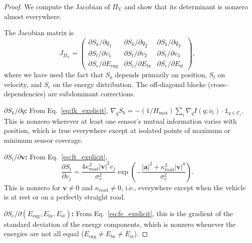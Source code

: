 \documentclass[twocolumn,10pt]{article}
\newcommand{\PiV}{\Pi_{\mathrm{V}}}
\newcommand{\Sk}{S_k}
\newcommand{\St}{S_t}
\newcommand{\Se}{S_e}
\newcommand{\Hmax}{H_{\mathrm{max}}}
\begin{document}
\begin{proof}
We compute the Jacobian of $\PiV$ and show that its determinant is nonzero almost everywhere.

The Jacobian matrix is
\begin{equation}
J_{\PiV} = \begin{pmatrix}
\partial \Sk / \partial q_1 & \partial \Sk / \partial q_2 & \partial \Sk / \partial q_3 \\
\partial \St / \partial v_1 & \partial \St / \partial v_2 & \partial \St / \partial v_3 \\
\partial \Se / \partial E_{\mathrm{eng}} & \partial \Se / \partial E_{\mathrm{br}} & \partial \Se / \partial E_{\mathrm{st}}
\end{pmatrix},
\end{equation}
where we have used the fact that $\Sk$ depends primarily on position, $\St$ on velocity, and $\Se$ on the energy distribution. The off-diagonal blocks (cross-dependencies) are subdominant corrections.

\textbf{$\partial \Sk / \partial q$:} From Eq.~\eqref{eq:fk_explicit}, $\nabla_q \Sk = -(1/\Hmax) \sum_i \nabla_q I(q; o_i) \cdot \mathbb{1}_{q \in \mathcal{C}_i}$. This is nonzero wherever at least one sensor's mutual information varies with position, which is true everywhere except at isolated points of maximum or minimum sensor coverage.

\textbf{$\partial \St / \partial \mathbf{v}$:} From Eq.~\eqref{eq:ft_explicit},
\begin{equation}
\frac{\partial \St}{\partial v_j} = \frac{4\kappa_{\mathrm{road}}^2 |\mathbf{v}|^2 v_j}{\sigma_v^2} \exp\left(-\frac{|\mathbf{a}|^2 + \kappa_{\mathrm{road}}^2 |\mathbf{v}|^4}{\sigma_v^2}\right).
\end{equation}
This is nonzero for $\mathbf{v} \neq 0$ and $\kappa_{\mathrm{road}} \neq 0$, i.e., everywhere except when the vehicle is at rest or on a perfectly straight road.

\textbf{$\partial \Se / \partial (E_{\mathrm{eng}}, E_{\mathrm{br}}, E_{\mathrm{st}})$:} From Eq.~\eqref{eq:fe_explicit}, this is the gradient of the standard deviation of the energy components, which is nonzero whenever the energies are not all equal ($E_{\mathrm{eng}} \neq E_{\mathrm{br}} \neq E_{\mathrm{st}}$).


\end{proof}
\end{document}
